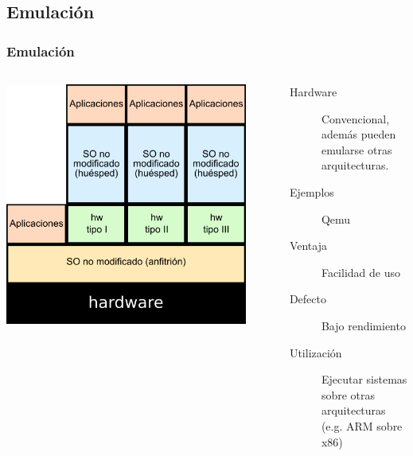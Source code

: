 \documentclass{beamer}
\begin{document}
\subsection{Emulación}
\begin{frame} \frametitle{Emulación}
  \begin{columns}
    \begin{center}
    \includegraphics[width=0.9\textwidth]{img/emulacion.png}      
    \end{center}
    \begin{description}
    \item[Hardware] Convencional, además pueden emularse otras arquitecturas.
    \item[Ejemplos] Qemu
    \item [Ventaja] Facilidad de uso
    \item[Defecto] Bajo rendimiento
    \item[Utilización] Ejecutar sistemas sobre otras arquitecturas
      (e.g. ARM sobre x86)
    \end{description}
  \end{columns}
\end{frame}
\end{document}

